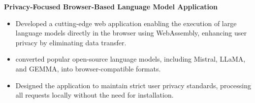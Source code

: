 \documentclass[10pt,a4]{article}
\begin{document}
{\begin{flushleft}
    \vspace{0.5mm}
    \item \textbf{\large Privacy-Focused Browser-Based Language Model Application}
        \vspace{0.5mm}
        \begin{itemize}
            \item Developed a cutting-edge web application enabling the execution of large language models directly in the browser using WebAssembly, enhancing user privacy by eliminating data transfer.
            \item converted popular open-source language models, including Mistral, LLaMA, and GEMMA, into browser-compatible formats.
            \item Designed the application to maintain strict user privacy standards, processing all requests locally without the need for installation.
        \end{itemize}

\end{flushleft}

}
	
\end{document}
